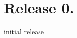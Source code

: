 \hypertarget{_releases_Release}{}\section{Release 0.}\label{_releases_Release}

\begin{DoxyItemize}
\item initial release 
\end{DoxyItemize}